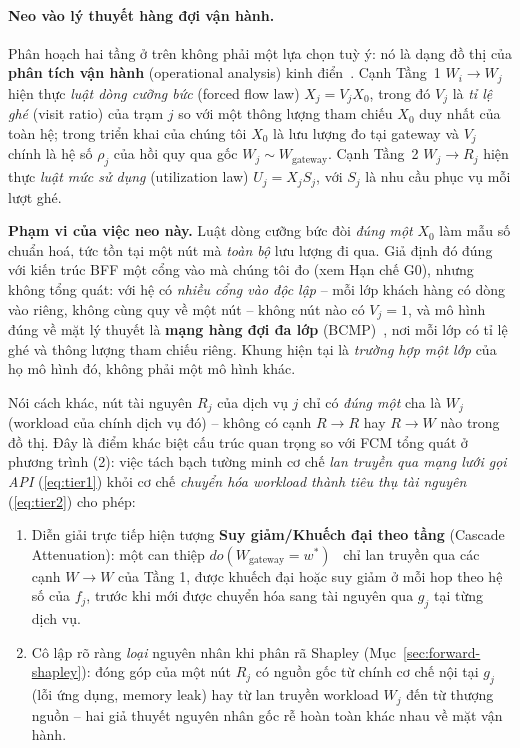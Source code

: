 \documentclass[11pt,a4paper]{article}
\begin{document}
\paragraph{Neo vào lý thuyết hàng đợi vận hành.}
Phân hoạch hai tầng ở trên không phải một lựa chọn tuỳ ý: nó là dạng đồ thị của
\textbf{phân tích vận hành} (operational analysis) kinh điển~\cite{denning1978operational}.
Cạnh Tầng~1 $W_i \to W_j$ hiện thực \emph{luật dòng cưỡng bức} (forced flow law)
$X_j = V_j X_0$, trong đó $V_j$ là \emph{tỉ lệ ghé} (visit ratio) của trạm $j$ so với
một thông lượng tham chiếu $X_0$ duy nhất của toàn hệ; trong triển khai của chúng tôi
$X_0$ là lưu lượng đo tại gateway và $V_j$ chính là hệ số $\rho_j$ của hồi quy qua gốc
$W_j \sim W_{\text{gateway}}$. Cạnh Tầng~2 $W_j \to R_j$ hiện thực \emph{luật mức sử
dụng} (utilization law) $U_j = X_j S_j$, với $S_j$ là nhu cầu phục vụ mỗi lượt ghé.

\textbf{Phạm vi của việc neo này.} Luật dòng cưỡng bức đòi \emph{đúng một} $X_0$ làm mẫu
số chuẩn hoá, tức tồn tại một nút mà \emph{toàn bộ} lưu lượng đi qua. Giả định đó đúng
với kiến trúc BFF một cổng vào mà chúng tôi đo (xem Hạn chế G0), nhưng không tổng quát:
với hệ có \emph{nhiều cổng vào độc lập} -- mỗi lớp khách hàng có dòng vào riêng, không
cùng quy về một nút -- không nút nào có $V_j = 1$, và mô hình đúng về mặt lý thuyết là
\textbf{mạng hàng đợi đa lớp} (BCMP)~\cite{baskett1975bcmp}, nơi mỗi lớp có tỉ lệ ghé và
thông lượng tham chiếu riêng. Khung hiện tại là \emph{trường hợp một lớp} của họ mô hình
đó, không phải một mô hình khác.

Nói cách khác, nút tài nguyên $R_j$ của dịch vụ $j$ chỉ có \emph{đúng một} cha là $W_j$ (workload của chính dịch vụ đó) -- không có cạnh $R \to R$ hay $R \to W$ nào trong đồ thị. Đây là điểm khác biệt cấu trúc quan trọng so với FCM tổng quát ở phương trình (2): việc tách bạch tường minh cơ chế \emph{lan truyền qua mạng lưới gọi API} (\ref{eq:tier1}) khỏi cơ chế \emph{chuyển hóa workload thành tiêu thụ tài nguyên} (\ref{eq:tier2}) cho phép:
\begin{enumerate}
    \item Diễn giải trực tiếp hiện tượng \textbf{Suy giảm/Khuếch đại theo tầng} (Cascade Attenuation): một can thiệp $do(W_{\text{gateway}} = w^*)$~\cite{pearl2009causality} chỉ lan truyền qua các cạnh $W \to W$ của Tầng 1, được khuếch đại hoặc suy giảm ở mỗi hop theo hệ số của $f_j$, trước khi mới được chuyển hóa sang tài nguyên qua $g_j$ tại từng dịch vụ.
    \item Cô lập rõ ràng \emph{loại} nguyên nhân khi phân rã Shapley (Mục~\ref{sec:forward-shapley}): đóng góp của một nút $R_j$ có nguồn gốc từ chính cơ chế nội tại $g_j$ (lỗi ứng dụng, memory leak) hay từ lan truyền workload $W_j$ đến từ thượng nguồn -- hai giả thuyết nguyên nhân gốc rễ hoàn toàn khác nhau về mặt vận hành.
\end{enumerate}
\end{document}
